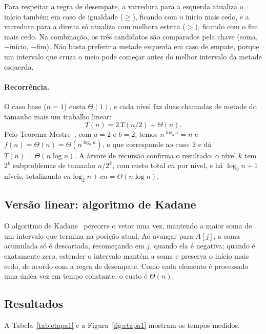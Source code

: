 \documentclass[11pt,a4paper]{article}
\begin{document}
Para respeitar a regra de desempate, a varredura para a esquerda atualiza o início também em caso de igualdade ($\geq$), ficando com o início mais cedo, e a varredura para a direita só atualiza com melhora estrita ($>$), ficando com o fim mais cedo. Na combinação, os três candidatos são comparados pela chave (soma, $-$início, $-$fim). Não basta preferir a metade esquerda em caso de empate, porque um intervalo que cruza o meio pode começar antes do melhor intervalo da metade esquerda.

\paragraph{Recorrência.} O caso base ($n = 1$) custa $\Theta(1)$, e cada nível faz duas chamadas de metade do tamanho mais um trabalho linear:
\[
T(n) = 2\,T(n/2) + \Theta(n).
\]
Pelo Teorema Mestre~\cite{clrs}, com $a = 2$ e $b = 2$, temos $n^{\log_b a} = n$ e $f(n) = \Theta(n) = \Theta(n^{\log_b a})$, o que corresponde ao caso~2 e dá $T(n) = \Theta(n \log n)$. A árvore de recursão confirma o resultado: o nível $k$ tem $2^k$ subproblemas de tamanho $n/2^k$, com custo total $cn$ por nível, e há $\log_2 n + 1$ níveis, totalizando $cn\log_2 n + cn = \Theta(n \log n)$.

\subsection{Versão linear: algoritmo de Kadane}

O algoritmo de Kadane~\cite{bentley} percorre o vetor uma vez, mantendo a maior soma de um intervalo que termina na posição atual. Ao avançar para $A[j]$, a soma acumulada só é descartada, recomeçando em $j$, quando ela é negativa; quando é exatamente zero, estender o intervalo mantém a soma e preserva o início mais cedo, de acordo com a regra de desempate. Como cada elemento é processado uma única vez em tempo constante, o custo é $\Theta(n)$.

\subsection{Resultados}

A Tabela~\ref{tab:etapa1} e a Figura~\ref{fig:etapa1} mostram os tempos medidos.

\begin{table}[H]
\centering\small

\caption{Etapa 1: tempo médio $\pm$ desvio padrão, em milissegundos, em 5 execuções.}
\label{tab:etapa1}
\end{table}
\end{document}
